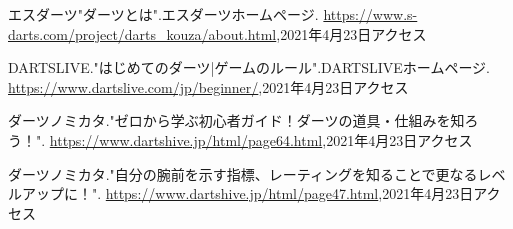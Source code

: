\documentclass{jsarticle}
\begin{document}
\newpage
\begin{thebibliography}{9}

エスダーツ"ダーツとは".エスダーツホームページ. \url{https://www.s-darts.com/project/darts_kouza/about.html},2021年4月23日アクセス

DARTSLIVE."はじめてのダーツ|ゲームのルール".DARTSLIVEホームページ. \url{https://www.dartslive.com/jp/beginner/},2021年4月23日アクセス

ダーツノミカタ."ゼロから学ぶ初心者ガイド！ダーツの道具・仕組みを知ろう！". \url{https://www.dartshive.jp/html/page64.html},2021年4月23日アクセス

ダーツノミカタ."自分の腕前を示す指標、レーティングを知ることで更なるレベルアップに！". \url{https://www.dartshive.jp/html/page47.html},2021年4月23日アクセス

\end{thebibliography}
\end{document}
